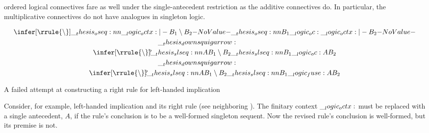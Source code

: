  ordered logical connectives fare as well under the single-antecedent restriction as the additive connectives do.
In particular, the multiplicative connectives do not have analogues in singleton logic.
% 
\begin{marginfigure}[7\baselineskip]
  \normalsize
  \begin{gather*}
    \infer[\rrule{\limp}]{\oseq{\octx |- B_1 \limp B_2}}{
      \oseq{B_1 \oc \octx |- B_2}}
    \\
    \mathord{\downsquigarrow}\hspace{5pt}\hphantom{\rrule{\limp}}
    \\
    \infer[\rrule{\limp}\mathrlap{?}]{\slseq{A |- B_1 \limp B_2}}{
      \slseq{B_1 \oc A |- B_2}}
    \\
    \mathord{\downsquigarrow}\hspace{5pt}\hphantom{\rrule{\limp}}
    \\
    \infer[\rrule{\limp}\mathrlap{?}]{\slseq{A |- B_1 \limp B_2}}{
      \slseq{B_1 \fuse A |- B_2}}
  \end{gather*}
  \caption{A failed attempt at constructing a right rule for left-handed implication}\label{fig:singleton-logic:seq-calc:derive-limp}
\end{marginfigure}%
%
Consider, for example, left-handed implication and its right rule (see neighboring ).
The finitary context $\__logic_octx:$ must be replaced with a single antecedent, $A$, if the rule's conclusion is to be a well-formed singleton sequent.
Now the revised rule's conclusion is well-formed, but its premise is not.

